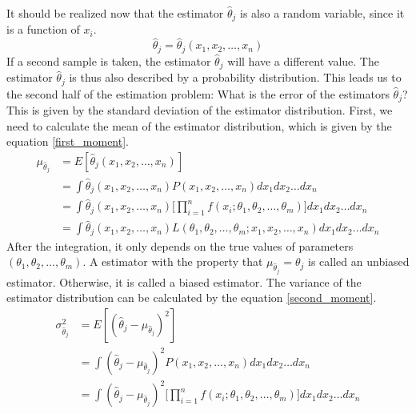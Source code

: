 \documentclass[12pt,a4paper]{report}
\begin{document}
It should be realized now that the estimator $\hat{\theta}_j$ is also a random variable, since it is a function of $x_i$.
\begin{equation*}
\hat{\theta}_j = \hat{\theta}_j(x_1,x_2,\dots,x_n)
\end{equation*}
If a second sample is taken, the estimator $\hat{\theta}_j$ will have a different value.
The estimator $\hat{\theta}_j$ is thus also described by a probability distribution.
This leads us to the second half of the estimation problem: What is the error of the estimators $\hat{\theta}_j$?
This is given by the standard deviation of the estimator distribution.
First, we need to calculate the mean of the estimator distribution, which is given by the equation \ref{first_moment}.
\begin{align*}
\mu_{\hat{\theta}_j}
&= E[\hat{\theta}_j(x_1,x_2,\dots,x_n)] \\
&= \int \hat{\theta}_j(x_1,x_2,\dots,x_n) P(x_1,x_2,\dots,x_n) dx_1 dx_2 \dots dx_n \\
&= \int \hat{\theta}_j(x_1,x_2,\dots,x_n) \Big[ \prod_{i = 1}^{n} f(x_i;\theta_1,\theta_2,\dots,\theta_m) \Big] dx_1 dx_2 \dots dx_n \\
&= \int \hat{\theta}_j(x_1,x_2,\dots,x_n) L(\theta_1,\theta_2,\dots,\theta_m;x_1,x_2,\dots,x_n) dx_1 dx_2 \dots dx_n
\end{align*}
After the integration, it only depends on the true values of parameters $(\theta_1,\theta_2,\dots,\theta_m)$.
A estimator with the property that $\mu_{\hat{\theta}_j} = \theta_j$ is called an unbiased estimator.
Otherwise, it is called a biased estimator.
The variance of the estimator distribution can be calculated by the equation \ref{second_moment}.
\begin{align*}
\sigma_{\hat{\theta}_j}^2
&= E[(\hat{\theta}_j - \mu_{\hat{\theta}_j} )^2] \\
&= \int (\hat{\theta}_j - \mu_{\hat{\theta}_j} )^2 P(x_1,x_2,\dots,x_n) dx_1 dx_2 \dots dx_n \\
&= \int (\hat{\theta}_j - \mu_{\hat{\theta}_j} )^2 \Big[ \prod_{i = 1}^{n} f(x_i;\theta_1,\theta_2,\dots,\theta_m) \Big] dx_1 dx_2 \dots dx_n
\end{align*}
\end{document}
